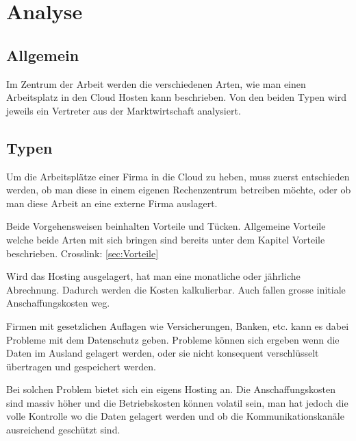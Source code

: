 

\chapter{Analyse}

\section{Allgemein}
	
Im Zentrum der Arbeit werden die verschiedenen Arten, wie man einen Arbeitsplatz in den Cloud Hosten kann beschrieben. Von den beiden Typen wird jeweils ein Vertreter aus der Marktwirtschaft analysiert.

\section{Typen}
Um die Arbeitsplätze einer Firma in die Cloud zu heben, muss zuerst entschieden werden, ob man diese in einem eigenen Rechenzentrum betreiben möchte, oder ob man diese Arbeit an eine externe Firma auslagert. 

Beide Vorgehensweisen beinhalten Vorteile und Tücken. Allgemeine Vorteile welche beide Arten mit sich bringen sind bereits unter dem Kapitel Vorteile beschrieben. Crosslink: \ref{sec:Vorteile}

Wird das Hosting ausgelagert, hat man eine monatliche oder jährliche Abrechnung. Dadurch werden die Kosten kalkulierbar. Auch fallen grosse initiale Anschaffungskosten weg.

Firmen mit gesetzlichen Auflagen wie Versicherungen, Banken, etc. kann es dabei Probleme mit dem Datenschutz geben. Probleme können sich ergeben wenn die Daten im Ausland gelagert werden, oder sie nicht konsequent verschlüsselt übertragen und gespeichert werden.

Bei solchen Problem bietet sich ein eigens Hosting an. Die Anschaffungskosten sind massiv höher und die Betriebskosten können volatil sein, man hat jedoch die volle Kontrolle wo die Daten gelagert werden und ob die Kommunikationskanäle ausreichend geschützt sind.

